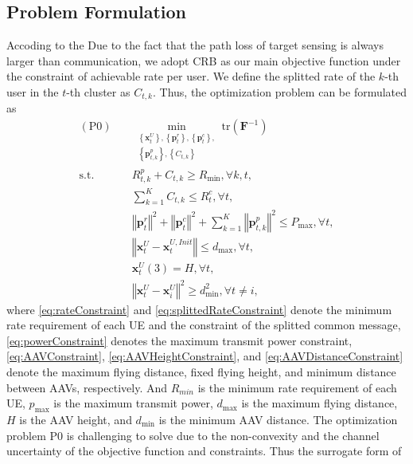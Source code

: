 \documentclass[twocolumn,journal]{IEEEtran}
\begin{document}
\subsection{Problem Formulation}
Accoding to the Due to the fact that the path loss of target sensing is always larger than communication, we adopt CRB as our main objective function under the constraint of achievable rate per user. We define the splitted rate of the \(k\)-th user in the \(t\)-th cluster as \(C_{t,k}\). Thus, the optimization problem can be formulated as
\begin{subequations}
\begin{align}
    (\text{P0})\quad&\min_{
        \substack{\left\{\boldsymbol{x}^{U}_{t}\right\},\left\{\boldsymbol{p}^{r}_{t}\right\},\left\{\boldsymbol{p}^{c}_{t}\right\},\\
    \left\{\boldsymbol{p}^{p}_{t,k}\right\},\left\{C_{t,k}
    \right\}}
    } \text{tr}(\mathbf{F}^{-1})\label{eq:obj}\\
    \text{s.t.}\quad& R^{p}_{t,k} + C_{t,k} \geq R_{\min}, \forall k,t,\label{eq:rateConstraint}\\
    & \sum_{k=1}^{K} C_{t,k} \leq R^{c}_{t}, \forall t, \label{eq:splittedRateConstraint}\\
    & \left\Vert\boldsymbol{p}^{r}_{t}\right\Vert^2 + \left\Vert \boldsymbol{p}^{c}_{t}\right\Vert^2 + \sum_{k=1}^{K} \left\Vert\boldsymbol{p}^{p}_{t,k}\right\Vert^2 \leq P_{\max}, \forall t, \label{eq:powerConstraint}\\
    & \left\Vert \boldsymbol{x}^{U}_{t} - \boldsymbol{x}^{U,Init}_{t}\right\Vert \leq d_{\max}, \forall t, \label{eq:AAVConstraint}\\
    & \boldsymbol{x}^{U}_{t}(3) = H, \forall t, \label{eq:AAVHeightConstraint}\\
    & \left\Vert \boldsymbol{x}^{U}_{t} - \boldsymbol{x}^{U}_{i} \right\Vert^2 \geq d^2_{\min}, \forall t\neq i, \label{eq:AAVDistanceConstraint}
\end{align}
\end{subequations}
where \eqref{eq:rateConstraint} and \eqref{eq:splittedRateConstraint} denote the minimum rate requirement of each UE and the constraint of the splitted common message, \eqref{eq:powerConstraint} denotes the maximum transmit power constraint, \eqref{eq:AAVConstraint}, \eqref{eq:AAVHeightConstraint}, and \eqref{eq:AAVDistanceConstraint} denote the maximum flying distance, fixed flying height, and minimum distance between AAVs, respectively. And \(R_{min}\) is the minimum rate requirement of each UE, \(p_{\max}\) is the maximum transmit power, \(d_{\max}\) is the maximum flying distance, \(H\) is the AAV height, and \(d_{\min}\) is the minimum AAV distance. The optimization problem P0 is challenging to solve due to the non-convexity and the channel uncertainty of the objective function and constraints. Thus the surrogate form of 
\end{document}
